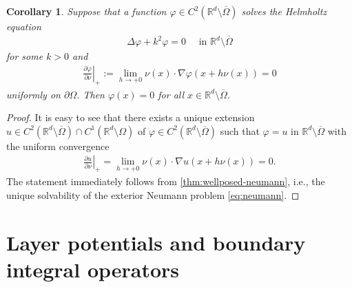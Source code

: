 \documentclass{article}
\theoremstyle{plain}
\newtheorem{cor}[thm]{Corollary}
\theoremstyle{definition}
\begin{document}
\begin{cor}
    Suppose that a function $\varphi\in C^2(\mathbb R^d\setminus\overline\Omega)$ solves the Helmholtz equation
    \begin{align*}
        \varDelta \varphi + k^2 \varphi  = 0 \quad\text{ in }\mathbb R^d\setminus\overline\Omega
    \end{align*}
    for some $k>0$ and 
    \begin{align}\label{eq:tmp1}
        \left.\frac{\partial \varphi}{\partial\nu}\right|_+ 
 := \lim_{h\to+0} \nu(x)\cdot \nabla\varphi (x+h\nu(x)) = 0 
    \end{align}
    uniformly on $\partial\Omega$. Then $\varphi (x)=0$ for all $x\in \mathbb R^d\setminus\overline\Omega$.
\end{cor}
\begin{proof}
    It is easy to see that there exists a unique extension $u\in C^2(\mathbb R^d\setminus\overline\Omega) \cap C^1(\mathbb R^d\setminus\Omega)$ of $\varphi\in C^2(\mathbb R^d\setminus\overline\Omega)$ such that $\varphi = u$ in $\mathbb R^d\setminus\overline\Omega$ with the uniform convergence 
    \begin{align*}
        \left.\frac{\partial u}{\partial\nu}\right|_+ = \lim_{h\to+0} \nu(x)\cdot \nabla u (x+h\nu(x)) = 0 .
    \end{align*}
    The statement immediately follows from \cref{thm:wellposed-neumann}, i.e., the unique solvability of the exterior Neumann problem \cref{eq:neumann}.
\end{proof}

\section{Layer potentials and boundary integral operators}




\end{document}
